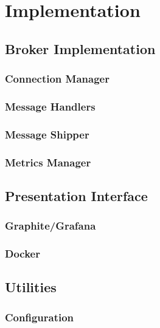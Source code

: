 \section{Implementation}
\label{sec:Implementation}

\subsection{Broker Implementation}
\label{sub:Broker Implementation}

\subsubsection{Connection Manager}
\label{subs:Connection Manager}

\subsubsection{Message Handlers}
\label{subs:Message Handlers}

\subsubsection{Message Shipper}
\label{subs:Message Shipper}

\subsubsection{Metrics Manager}
\label{subs:Metrics Manager}

\subsection{Presentation Interface}
\label{sub:Presentation Interface}

\subsubsection{Graphite/Grafana}
\label{subs:Graphite/Grafana}

\subsubsection{Docker}
\label{subs:Docker}

\subsection{Utilities}
\label{sub:Utilities}

\subsubsection{Configuration}
\label{subs:Configuration}
